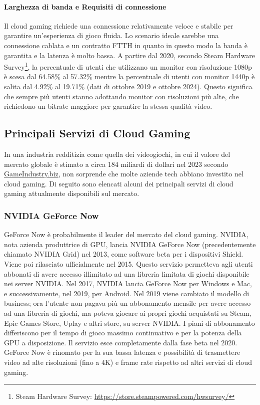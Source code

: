 \documentclass[12pt,a4paper,openright,twoside]{book}
\begin{document}
\paragraph{Larghezza di banda e Requisiti di connessione} Il cloud gaming richiede una connessione relativamente veloce e stabile per garantire un'esperienza di gioco fluida. Lo scenario ideale sarebbe una connessione cablata e un contratto FTTH in quanto in questo modo la banda è garantita e la latenza è molto bassa. A partire dal 2020, secondo Steam Hardware Survey\footnote{Steam Hardware Survey: \url{https://store.steampowered.com/hwsurvey/}}, la percentuale di utenti che utilizzano un monitor con risoluzione 1080p è scesa dal 64.58\% al 57.32\% mentre la percentuale di utenti con monitor 1440p è salita dal 4.92\% al 19.71\% (dati di ottobre 2019 e ottobre 2024). Questo significa che sempre più utenti stanno adottando monitor con risoluzioni più alte, che richiedono un bitrate maggiore per garantire la stessa qualità video.

\subsection{Principali Servizi di Cloud Gaming}
In una industria redditizia come quella dei videogiochi, in cui il valore del mercato globale è stimato a circa 184 miliardi di dollari nel 2023 secondo \href{https://www.gamesindustry.biz/gamesindustrybiz-presents-the-year-in-number-2023}{GameIndustry.biz}, non sorprende che molte aziende tech abbiano investito nel cloud gaming. Di seguito sono elencati alcuni dei principali servizi di cloud gaming attualmente disponibili sul mercato.

\subsubsection{NVIDIA GeForce Now}
GeForce Now è probabilmente il leader del mercato del cloud gaming. NVIDIA, nota azienda produttrice di GPU, lancia NVIDIA GeForce Now (precedentemente chiamato NVIDIA Grid) nel 2013, come software beta per i dispositivi Shield. Viene poi rilasciato ufficialmente nel 2015. Questo servizio permetteva agli utenti abbonati di avere accesso illimitato ad una libreria limitata di giochi disponibile nei server NVIDIA.
Nel 2017, NVIDIA lancia GeForce Now per Windows e Mac, e successivamente, nel 2019, per Android. Nel 2019 viene cambiato il modello di business; ora l'utente non pagava più un abbonamento mensile per avere accesso ad una libreria di giochi, ma poteva giocare ai propri giochi acquistati su Steam, Epic Games Store, Uplay e altri store, su server NVIDIA. I piani di abbonamento differiscono per il tempo di gioco massimo continuativo e per la potenza della GPU a disposizione.
Il servizio esce completamente dalla fase beta nel 2020.
GeForce Now è rinomato per la sua bassa latenza e possibilità di trasmettere video ad alte risoluzioni (fino a 4K) e frame rate rispetto ad altri servizi di cloud gaming.
\end{document}
